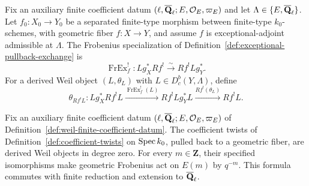 \begin{definition}
\label{def:weil-exceptional-pullback-object}


Fix an auxiliary finite coefficient datum
\((\ell,\overline{\mathbf Q}_\ell;E,\mathcal O_E,\varpi_E)\) and let
\(\Lambda\in\{E,\overline{\mathbf Q}_\ell\}\).  Let \(f_0:X_0\to Y_0\) be a separated
finite-type morphism between finite-type \(k_0\)-schemes, with geometric
fiber \(f:X\to Y\), and assume
\(f\) is exceptional-adjoint admissible at \(\Lambda\).  The Frobenius specialization
of Definition~\ref{def:exceptional-pullback-exchange} is
\[
 \operatorname{FrEx}_{f}^{!}:Lg_X^*Rf^!\xrightarrow{\sim}Rf^!Lg_Y^*.
\]
For a derived Weil object \((L,\theta_L)\) with
\(L\in D^b_c(Y,\Lambda)\), define
\[
 \theta_{Rf^!L}:Lg_X^*Rf^!L
 \xrightarrow{\operatorname{FrEx}_{f}^{!}(L)}Rf^!Lg_Y^*L
 \xrightarrow{Rf^!(\theta_L)}Rf^!L.
\]
\end{definition}


\begin{definition}
\label{def:frobenius-on-twists}


Fix an auxiliary finite coefficient datum
\((\ell,\overline{\mathbf Q}_\ell;E,\mathcal O_E,\varpi_E)\) of
Definition~\ref{def:weil-finite-coefficient-datum}.
The coefficient twists of Definition~\ref{def:coefficient-twists} on
\(\operatorname{Spec} k_0\), pulled back to a geometric fiber, are derived Weil objects in
degree zero.  For every \(m\in\mathbf Z\), their specified isomorphisms make
geometric Frobenius act on \(E(m)\) by \(q^{-m}\).  This formula commutes
with finite reduction and extension to \(\overline{\mathbf Q}_\ell\).
\end{definition}


